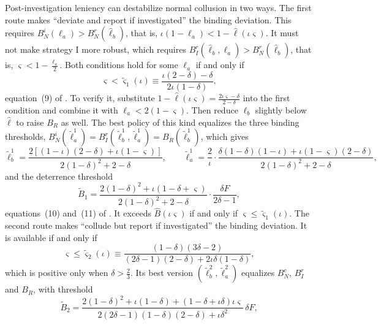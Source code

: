 Post-investigation leniency can destabilize normal collusion in two ways. The first route makes ``deviate and report
if investigated'' the binding deviation. This requires $B_N^i(\ell_a) > B_N^r(\hat\ell_b)$, that is,
$\iota(1-\ell_a) < 1 - \hat\ell(\iota\varsigma)$. It must not make strategy I more robust, which requires
$B_I^r(\hat\ell_b, \ell_a) > B_N^r(\hat\ell_b)$, that is, $\varsigma < 1 - \frac{\ell_a}{2}$. Both conditions hold for
some $\ell_a$ if and only if
\begin{equation}\label{eq:12-cr-p1}
\varsigma < \tilde\varsigma_1(\iota) \equiv \frac{\iota(2-\delta) - \delta}{2\iota(1-\delta)},
\end{equation}
equation~(9) of \citet{ChenRey2013}. To verify it, substitute $1 - \hat\ell(\iota\varsigma) =
\frac{2\iota\varsigma - \delta}{2-\delta}$ into the first condition and combine it with $\ell_a < 2(1-\varsigma)$.
Then reduce $\ell_b$ slightly below $\hat\ell$ to raise $B_R$ as well. The best policy of this kind equalizes the three
binding thresholds, $B_N^i(\tilde\ell_a^1) = B_I^r(\tilde\ell_b^1, \tilde\ell_a^1) = B_R(\tilde\ell_b^1)$, which gives
\begin{equation}\label{eq:12-cr-policy1}
\tilde\ell_b^1 = \frac{2[(1-\iota)(2-\delta) + \iota(1-\varsigma)]}{2(1-\delta)^2 + 2 - \delta},\qquad
\tilde\ell_a^1 = \frac{2}{\iota}\cdot\frac{\delta(1-\delta)(1-\iota) + \iota(1-\varsigma)(2-\delta)}{2(1-\delta)^2 + 2 - \delta},
\end{equation}
and the deterrence threshold
\begin{equation}\label{eq:12-cr-B1}
\tilde B_1 = \frac{2(1-\delta)^2 + \iota(1 - \delta + \varsigma)}{2(1-\delta)^2 + 2 - \delta}\cdot\frac{\delta F}{2\delta - 1},
\end{equation}
equations~(10) and~(11) of \citet{ChenRey2013}. It exceeds $\hat B(\iota\varsigma)$ if and only if
$\varsigma \le \tilde\varsigma_1(\iota)$. The second route makes ``collude but report if investigated'' the binding
deviation. It is available if and only if
\begin{equation}\label{eq:12-cr-p2}
\varsigma \le \tilde\varsigma_2(\iota) \equiv \frac{(1-\delta)(3\delta - 2)}{(2\delta - 1)(2-\delta) + 2\iota\delta(1-\delta)},
\end{equation}
which is positive only when $\delta > \frac{2}{3}$. Its best version $(\tilde\ell_b^2, \tilde\ell_a^2)$ equalizes
$B_N^c$, $B_I^r$ and $B_R$, with threshold
\begin{equation}\label{eq:12-cr-B2}
\tilde B_2 = \frac{2(1-\delta)^2 + \iota(1-\delta) + (1 - \delta + \iota\delta)\iota\varsigma}
{2(2\delta - 1)(1-\delta)(2-\delta) + \iota\delta^2}\,\delta F,
\end{equation}

